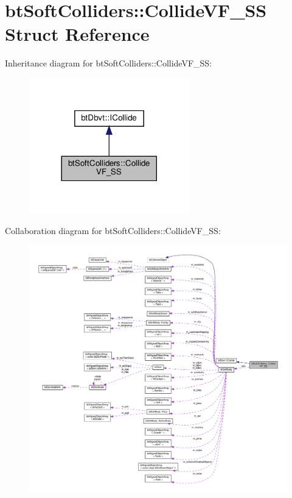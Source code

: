 \hypertarget{structbtSoftColliders_1_1CollideVF__SS}{}\section{bt\+Soft\+Colliders\+:\+:Collide\+V\+F\+\_\+\+SS Struct Reference}
\label{structbtSoftColliders_1_1CollideVF__SS}


Inheritance diagram for bt\+Soft\+Colliders\+:\+:Collide\+V\+F\+\_\+\+SS\+:
\nopagebreak
\begin{figure}[H]
\begin{center}
\leavevmode
\includegraphics[width=197pt]{structbtSoftColliders_1_1CollideVF__SS__inherit__graph}
\end{center}
\end{figure}


Collaboration diagram for bt\+Soft\+Colliders\+:\+:Collide\+V\+F\+\_\+\+SS\+:
\nopagebreak
\begin{figure}[H]
\begin{center}
\leavevmode
\includegraphics[width=350pt]{structbtSoftColliders_1_1CollideVF__SS__coll__graph}
\end{center}
\end{figure}
